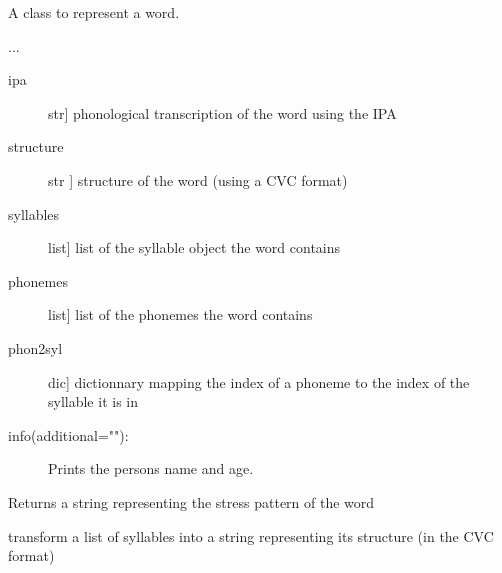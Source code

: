 \documentclass[letterpaper,10pt,english]{sphinxmanual}
\begin{document}
\begin{fulllineitems}
\label{\detokenize{index:Word.Word}}
\sphinxAtStartPar
A class to represent a word.

\sphinxAtStartPar
...
\begin{description}
\item[{ipa}] \leavevmode{[}str{]}
\sphinxAtStartPar
phonological transcription of the word using the IPA

\item[{structure}] \leavevmode{[}str {]}
\sphinxAtStartPar
structure of the word (using a CVC format)

\item[{syllables}] \leavevmode{[}list{]}
\sphinxAtStartPar
list of the syllable object the word contains

\item[{phonemes}] \leavevmode{[}list{]}
\sphinxAtStartPar
list of the phonemes the word contains

\item[{phon2syl}] \leavevmode{[}dic{]}
\sphinxAtStartPar
dictionnary mapping the index of a phoneme to the index of the syllable it is in

\end{description}
\begin{description}
\item[{info(additional=""):}] \leavevmode
\sphinxAtStartPar
Prints the person\textquotesingle{}s name and age.

\end{description}

\begin{fulllineitems}
\label{\detokenize{index:Word.Word.get_stess_pattern}}
\sphinxAtStartPar
Returns a string representing the stress pattern of the word

\end{fulllineitems}


\begin{fulllineitems}
\label{\detokenize{index:Word.Word.get_structure}}
\sphinxAtStartPar
transform a list of syllables into a string representing its structure (in the CVC format)

\end{fulllineitems}


\end{fulllineitems}
\end{document}
